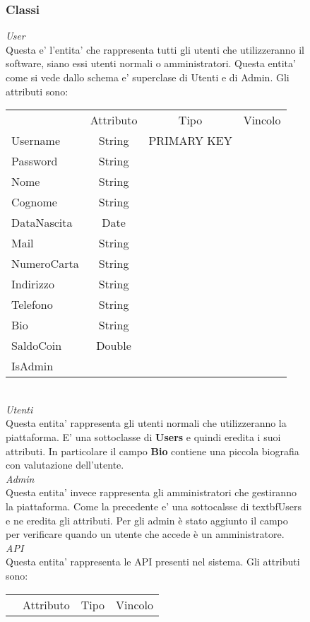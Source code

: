 {{\begin{figure}[ht]
			\subsubsection{Classi}
			\textit{User}\\
			Questa e' l'entita' che rappresenta tutti gli utenti che utilizzeranno il software, siano essi utenti normali o amministratori. Questa entita' come si vede dallo schema e' superclase di Utenti e di Admin. Gli attributi sono: 
			\begin{center}
			\begin{tabular}{lccc}
				&Attributo&Tipo&Vincolo\\
				Username&String&PRIMARY KEY\\
				Password&String& \\
				Nome&String& \\
				Cognome&String& \\
				DataNascita&Date& \\
				Mail&String& \\
				NumeroCarta&String& \\
				Indirizzo&String& \\
				Telefono&String& \\
				Bio&String& \\
				SaldoCoin&Double& \\
				IsAdmin\\
			\end{tabular}
			\end{center} \\
			\textit{Utenti}\\
			Questa entita' rappresenta gli utenti normali che utilizzeranno la piattaforma. E' una sottoclasse di \textbf{Users} e quindi eredita i suoi attributi. In particolare il campo \textbf{Bio} contiene una piccola biografia con valutazione dell'utente.  \\
			\textit{Admin}\\
			Questa entita' invece rappresenta gli amministratori che gestiranno la piattaforma. Come la precedente e' una sottocalsse di textbf{Users} e ne eredita gli attributi. Per gli admin è stato aggiunto il campo  per verificare quando un utente che accede è un amministratore. \\
			\textit{API}\\
			Questa entita' rappresenta le API presenti nel sistema. Gli attributi sono:
			\begin{center}
			\begin{tabular}{lccc}
				&Attributo&Tipo&Vincolo\\

\end{tabular}
\end{center}
\end{figure}}}
